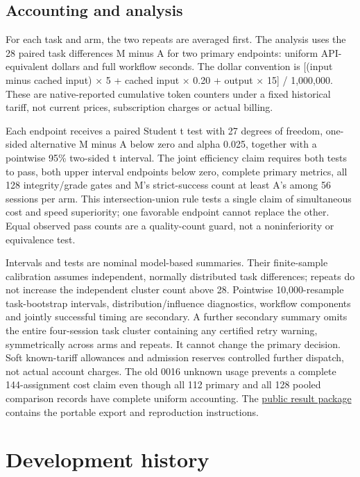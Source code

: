 \documentclass[manuscript,screen,nonacm]{acmart}
\begin{document}
\subsection{Accounting and analysis}\label{accounting-and-analysis}

For each task and arm, the two repeats are averaged first. The analysis
uses the 28 paired task differences M minus A for two primary endpoints:
uniform API-equivalent dollars and full workflow seconds. The dollar
convention is {[}(input minus cached input) × 5 + cached input × 0.20 +
output × 15{]} / 1,000,000. These are native-reported cumulative token
counters under a fixed historical tariff, not current prices,
subscription charges or actual billing.

Each endpoint receives a paired Student t test with 27 degrees of
freedom, one-sided alternative M minus A below zero and alpha 0.025,
together with a pointwise 95\% two-sided t interval. The joint
efficiency claim requires both tests to pass, both upper interval
endpoints below zero, complete primary metrics, all 128 integrity/grade
gates and M's strict-success count at least A's among 56 sessions per
arm. This intersection-union rule tests a single claim of simultaneous
cost and speed superiority; one favorable endpoint cannot replace the
other. Equal observed pass counts are a quality-count guard, not a
noninferiority or equivalence test.

Intervals and tests are nominal model-based summaries. Their
finite-sample calibration assumes independent, normally distributed task
differences; repeats do not increase the independent cluster count above
28. Pointwise 10,000-resample task-bootstrap intervals,
distribution/influence diagnostics, workflow components and jointly
successful timing are secondary. A further secondary summary omits the
entire four-session task cluster containing any certified retry warning,
symmetrically across arms and repeats. It cannot change the primary
decision. Soft known-tariff allowances and admission reserves controlled
further dispatch, not actual account charges. The old 0016 unknown usage
prevents a complete 144-assignment cost claim even though all 112
primary and all 128 pooled comparison records have complete uniform
accounting. The
\href{https://github.com/iamsreecharan/Memglide/blob/main/research/results/router-v7-20261021/README.md}{public
result package} contains the portable export and reproduction
instructions.

\section{Development history}\label{development-history}
\end{document}
